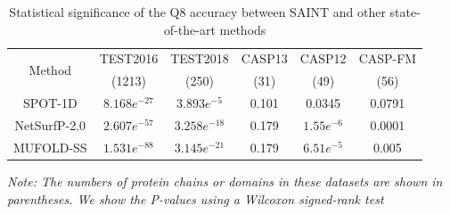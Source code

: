 \documentclass[11 pt, a4paper]{article}
\begin{document}
\begin{table}[ht]
\centering
\caption{Statistical significance of the Q8 accuracy between
SAINT and  other state-of-the-art methods}
\begin{tabular}{cccccc}
\\
\hline
\multirow{2}{*}{Method} &TEST2016 &TEST2018 &CASP13 &CASP12
&CASP-FM \\
&(1213) &(250) &(31) &(49) &(56)\\
\hline
SPOT-1D &$8.168e^{-27}$  &$3.893e^{-5}$  &0.101  &0.0345
&0.0791 \\
NetSurfP-2.0 &$2.607e^{-57}$  &$3.258e^{-18}$ &0.179
&$1.55e^{-6}$  &0.0001\\
MUFOLD-SS &$1.531e^{-88}$  &$3.145e^{-21}$  &0.179
&$6.51e^{-5}$  &0.005\\
\hline
\end{tabular}
    \label{Table 2}
\end{table}

\newpage
\textit{Note: The numbers of protein chains or domains in
these datasets are shown in parentheses. We show the P-values
using a Wilcoxon signed-rank test}
\end{document}
